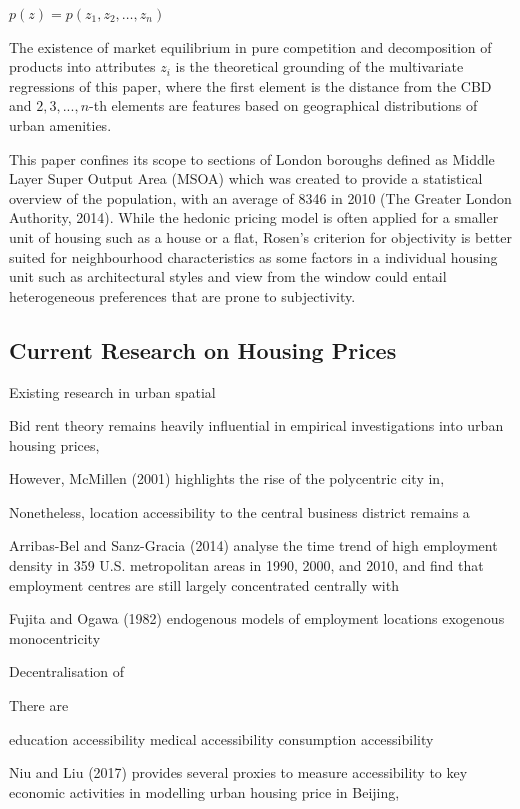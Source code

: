 \documentclass{article}
\begin{document}
\begin{center}
    $p ( z ) = p \left( z _ { 1 } , z _ { 2 } , \dots , z _ { n } \right)$
\end{center}

The existence of market equilibrium in pure competition and decomposition of products into attributes $z_i$ is the theoretical grounding of the multivariate regressions of this paper, where the first element is the distance from the CBD and $2, 3, ..., n$-th elements are features based on geographical distributions of urban amenities.

This paper confines its scope to sections of London boroughs defined as Middle Layer Super Output Area (MSOA) which was created to provide a statistical overview of the population, with an average of 8346 in 2010 (The Greater London Authority, 2014). While the hedonic pricing model is often applied for a smaller unit of housing such as a house or a flat, Rosen's criterion for objectivity is better suited for neighbourhood characteristics as some factors in a individual housing unit such as architectural styles and view from the window could entail heterogeneous preferences that are prone to subjectivity.

\subsection{Current Research on Housing Prices}
Existing research in urban spatial 


Bid rent theory remains heavily influential in empirical investigations into urban housing prices, 

However, McMillen (2001) highlights the rise of the polycentric city in, 

Nonetheless, location accessibility to the central business district remains a


Arribas-Bel and Sanz-Gracia (2014) analyse the time trend of high employment density in 359 U.S. metropolitan areas in 1990, 2000, and 2010, and find that employment centres are still largely concentrated centrally with   


Fujita and Ogawa (1982) endogenous models of employment locations
exogenous monocentricity

Decentralisation of 

There are 


education accessibility
medical accessibility
consumption accessibility

Niu and Liu (2017) provides several proxies to measure accessibility to key economic activities in modelling urban housing price in Beijing,  
\end{document}
